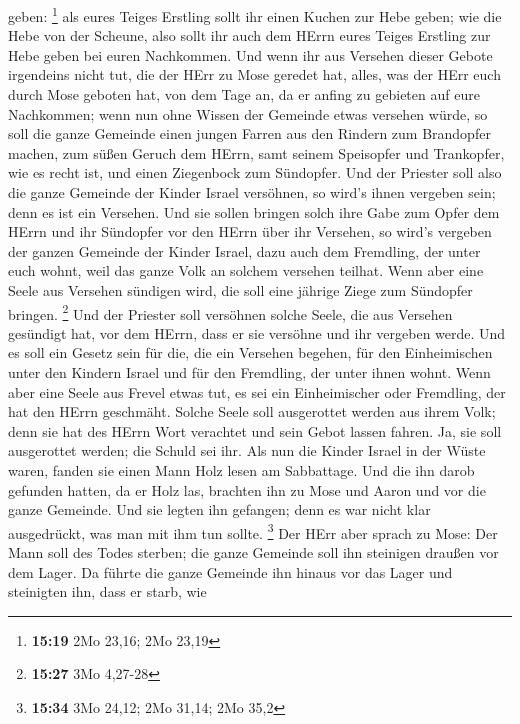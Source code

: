 geben: \footnote{\textbf{15:19} 2Mo 23,16; 2Mo 23,19}  als
eures Teiges Erstling sollt ihr einen Kuchen zur Hebe geben; wie die
Hebe von der Scheune,  also sollt ihr auch dem HErrn eures
Teiges Erstling zur Hebe geben bei euren Nachkommen.  Und
wenn ihr aus Versehen dieser Gebote irgendeins nicht tut, die der HErr
zu Mose geredet hat,  alles, was der HErr euch durch Mose
geboten hat, von dem Tage an, da er anfing zu gebieten auf eure
Nachkommen;  wenn nun ohne Wissen der Gemeinde etwas
versehen würde, so soll die ganze Gemeinde einen jungen Farren aus den
Rindern zum Brandopfer machen, zum süßen Geruch dem HErrn, samt seinem
Speisopfer und Trankopfer, wie es recht ist, und einen Ziegenbock zum
Sündopfer.  Und der Priester soll also die ganze Gemeinde
der Kinder Israel versöhnen, so wird's ihnen vergeben sein; denn es ist
ein Versehen. Und sie sollen bringen solch ihre Gabe zum Opfer dem HErrn
und ihr Sündopfer vor den HErrn über ihr Versehen,  so
wird's vergeben der ganzen Gemeinde der Kinder Israel, dazu auch dem
Fremdling, der unter euch wohnt, weil das ganze Volk an solchem versehen
teilhat.  Wenn aber eine Seele aus Versehen sündigen wird,
die soll eine jährige Ziege zum Sündopfer bringen. \footnote{\textbf{15:27}
  3Mo 4,27-28}  Und der Priester soll versöhnen solche
Seele, die aus Versehen gesündigt hat, vor dem HErrn, dass er sie
versöhne und ihr vergeben werde.  Und es soll ein Gesetz
sein für die, die ein Versehen begehen, für den Einheimischen unter den
Kindern Israel und für den Fremdling, der unter ihnen wohnt.
 Wenn aber eine Seele aus Frevel etwas tut, es sei ein
Einheimischer oder Fremdling, der hat den HErrn geschmäht. Solche Seele
soll ausgerottet werden aus ihrem Volk;  denn sie hat des
HErrn Wort verachtet und sein Gebot lassen fahren. Ja, sie soll
ausgerottet werden; die Schuld sei ihr.  Als nun die Kinder
Israel in der Wüste waren, fanden sie einen Mann Holz lesen am
Sabbattage.  Und die ihn darob gefunden hatten, da er Holz
las, brachten ihn zu Mose und Aaron und vor die ganze Gemeinde.
 Und sie legten ihn gefangen; denn es war nicht klar
ausgedrückt, was man mit ihm tun sollte. \footnote{\textbf{15:34} 3Mo
  24,12; 2Mo 31,14; 2Mo 35,2}  Der HErr aber sprach zu
Mose: Der Mann soll des Todes sterben; die ganze Gemeinde soll ihn
steinigen draußen vor dem Lager.  Da führte die ganze
Gemeinde ihn hinaus vor das Lager und steinigten ihn, dass er starb, wie
